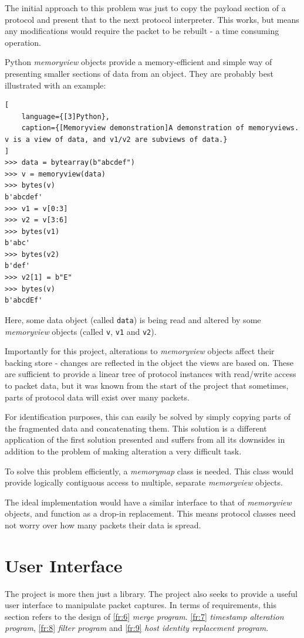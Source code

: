\documentclass[10pt,a4paper,notitlepage]{report}
\begin{document}
The initial approach to this problem was just to copy the payload section of a protocol and present that to the next protocol interpreter. This works, but means any modifications would require the packet to be rebuilt - a time consuming operation.

Python \emph{memoryview} objects provide a memory-efficient and simple way of presenting smaller sections of data from an object. They are probably best illustrated with an example:
\begin{lstlisting}[
	language={[3]Python},
   	caption={[Memoryview demonstration]A demonstration of memoryviews. v is a view of data, and v1/v2 are subviews of data.}
]
>>> data = bytearray(b"abcdef")
>>> v = memoryview(data)
>>> bytes(v)
b'abcdef'
>>> v1 = v[0:3]
>>> v2 = v[3:6]
>>> bytes(v1)
b'abc'
>>> bytes(v2)
b'def'
>>> v2[1] = b"E"
>>> bytes(v)
b'abcdEf'
\end{lstlisting}
Here, some data object (called \texttt{data}) is being read and altered by some \emph{memoryview} objects (called \texttt{v}, \texttt{v1} and \texttt{v2}).

Importantly for this project, alterations to \emph{memoryview} objects affect their backing store - changes are reflected in the object the views are based on. These are sufficient to provide a linear tree of protocol instances with read/write access to packet data, but it was known from the start of the project that sometimes, parts of protocol data will exist over many packets.

For identification purposes, this can easily be solved by simply copying parts of the fragmented data and concatenating them. This solution is a different application of the first solution presented and suffers from all its downsides in addition to the problem of making alteration a very difficult task.

To solve this problem efficiently, a \emph{memorymap} class is needed. This class would provide logically contiguous access to multiple, separate \emph{memoryview} objects.

The ideal implementation would have a similar interface to that of \emph{memoryview} objects, and function as a drop-in replacement. This means protocol classes need not worry over how many packets their data is spread.

\section{User Interface}
The project is more then just a library. The project also seeks to provide a useful user interface to manipulate packet captures. In terms of requirements, this section refers to the design of \ref{fr:6} \emph{merge program}. \ref{fr:7} \emph{timestamp alteration program}, \ref{fr:8} \emph{filter program} and \ref{fr:9} \emph{host identity replacement program}.
\end{document}
